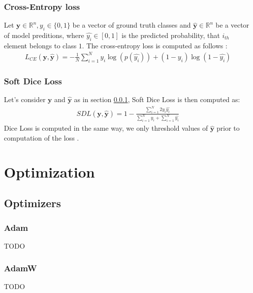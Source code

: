 \subsubsection{Cross-Entropy loss}
\label{sec:cross_entropy}
Let $\mathbf{y} \in \mathbb{R}^n, y_i \in \{ 0, 1 \}$ be a vector of ground truth classes and $\hat{\mathbf{y}} \in \mathbb{R}^n$ be a vector of model preditions, where $\hat{y_i} \in [0, 1]$ is the predicted probability, that $i_{th}$ element belongs to class $1$. The cross-entropy loss is computed as follows \cite{Jadon2020}:
\begin{align}
    L_{CE}(\mathbf{y}, \hat{\mathbf{y}}) = - \frac{1}{N} \sum_{i=1}^N y_i \log (p(\hat{y_i})) + (1 - y_i) \log (1 - \hat{y_i})
\end{align}

\subsubsection{Soft Dice Loss}
Let's consider $\mathbf{y}$ and $\hat{\mathbf{y}}$ as in section \ref{sec:cross_entropy}, Soft Dice Loss is then computed as:
\begin{align}
    SDL(\mathbf{y}, \hat{\mathbf{y}}) = 1 - \frac{\sum_{i=1}^N 2y_i \hat{y_i}}{\sum_{i=1}^N y_i + \sum_{i=1}^N \hat{y_i}}
\end{align}
Dice Loss is computed in the same way, we only threshold values of $\hat{\mathbf{y}}$ prior to computation of the loss \cite{Softdiceloss,Jadon2020}.



\section{Optimization}
\subsection{Optimizers}
\subsubsection{Adam}
TODO
\subsubsection{AdamW}
TODO

